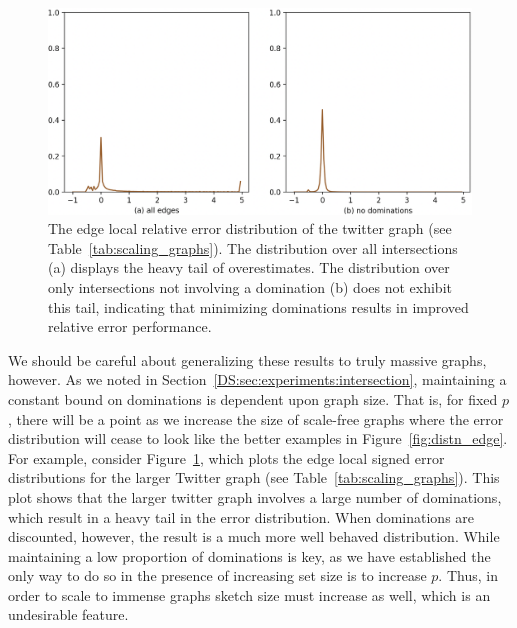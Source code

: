 \documentclass[10]{article}
\begin{document}
\begin{figure}
	\centerline{\includegraphics[width=0.8\columnwidth]{dist_twitter}}
	\caption{The edge local relative error distribution of the twitter graph (see Table~\ref{tab:scaling_graphs}).
	The distribution over all intersections (a) displays the heavy tail of overestimates.
	The distribution over only intersections not involving a domination (b) does not exhibit this tail, indicating that minimizing dominations results in improved relative error performance.
	\label{fig:dist_twitter}}
\end{figure}


We should be careful about generalizing these results to truly massive graphs, however.
As we noted in Section~\ref{DS:sec:experiments:intersection}, maintaining a constant bound on dominations is dependent upon graph size. 
That is, for fixed $p$, there will be a point as we increase the size of scale-free graphs where the error distribution will cease to look like the better examples in Figure~\ref{fig:distn_edge}. 
For example, consider Figure~\ref{fig:dist_twitter}, which plots the edge local signed error distributions for the larger Twitter graph (see Table~\ref{tab:scaling_graphs}).
This plot shows that the larger twitter graph involves a large number of dominations, which result in a heavy tail in the error distribution. 
When dominations are discounted, however, the result is a much more well behaved distribution.
While maintaining a low proportion of dominations is key, as we have established the only way to do so in the presence of increasing set size is to increase $p$.
Thus, in order to scale to immense graphs sketch size must increase as well, which is an undesirable feature. 
\end{document}
